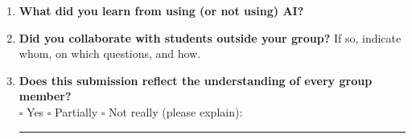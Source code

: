 \documentclass[11pt,a4paper]{article}
\begin{document}
\begin{enumerate}
\item \textbf{What did you learn from using (or not using) AI?}

\item \textbf{Did you collaborate with students outside your group?} If so, indicate whom, on which questions, and how.

\item \textbf{Does this submission reflect the understanding of every group member?}\\
$\square$ Yes \qquad $\square$ Partially \qquad $\square$ Not really (please explain): \rule{4cm}{0.4pt}
\end{enumerate}
\end{document}
